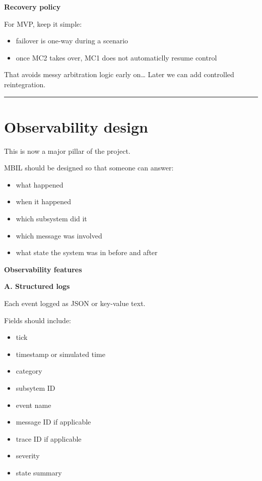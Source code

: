 \documentclass{report}
\begin{document}
\textbf{Recovery policy}

For MVP, keep it simple: 
\begin{itemize}
   \item failover is one-way during a scenario
   \item once MC2 takes over, MC1 does not automaticlly resume control 
\end{itemize}

That avoids messy arbitration logic early on\dots
Later we can add controlled reintegration. 

\begin{center}
\rule{0.9\textwidth}{1pt}
\end{center}
\section{Observability design}

This is now a major pillar of the project.

MBIL should be designed so that someone can answer:

\begin{itemize}
   \item what happened
   \item when it happened
   \item which subsystem did it
   \item which message was involved
   \item what state the system was in before and after
\end{itemize}

\textbf{Observability features}

\textbf{A. Structured logs}

Each event logged as JSON or key-value text. 

Fields should include:
\begin{itemize}
   \item tick
   \item timestamp or simulated time
   \item category
   \item subsytem ID
   \item event name
   \item message ID if applicable
   \item trace ID if applicable
   \item severity
   \item state summary
\end{itemize}
\end{document}
